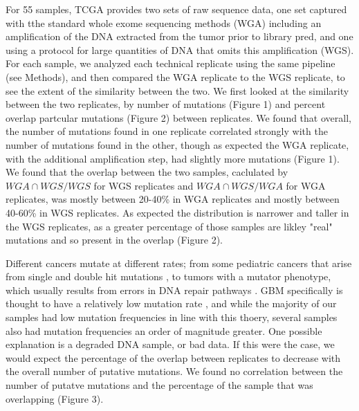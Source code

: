\documentclass[11pt]{article} %
\begin{document}
For 55 samples, TCGA provides two sets of raw sequence data, one set captured with tthe standard whole exome sequencing methods (WGA) including an amplification of the DNA extracted from the tumor prior to library pred, and one using a protocol for large quantities of DNA that omits this amplification (WGS). For each sample, we analyzed each technical replicate using the same pipeline (see Methods), and then compared the WGA replicate to the WGS replicate, to see the extent of the similarity between the two. We first looked at the similarity between the two replicates, by number of mutations (Figure 1) and percent overlap partcular mutations (Figure 2) between replicates. We found that overall, the number of mutations found in one replicate correlated strongly with the number of mutations found in the other, though as expected the WGA replicate, with the additional amplification step, had slightly more mutations (Figure 1). We found that the overlap between the two samples, caclulated by $WGA \cap WGS/WGS$ for WGS replicates and $WGA \cap WGS/WGA$ for WGA replicates, was mostly between 20-40\% in WGA replicates and mostly between 40-60\% in WGS replicates. As expected the distribution is narrower and taller in the WGS replicates, as a greater percentage of those samples are likley "real" mutations and so present in the overlap (Figure 2).

Different cancers mutate at different rates; from some pediatric cancers that arise from single and double hit mutations \cite{pediatric}, to tumors with a mutator phenotype, which usually results from errors in DNA repair pathways \cite{mutator}. GBM specifically is thought to have a relatively low mutation rate \cite{GBM_mut_rate}, and while the majority of our samples had low mutation frequencies in line with this thoery, several samples also had mutation frequencies an order of magnitude greater. One possible explanation is a degraded DNA sample, or bad data. If this were the case, we would expect the percentage of the overlap between replicates to decrease with the overall number of putative mutations. We found no correlation between the number of putatve mutations and the percentage of the sample that was overlapping (Figure 3). 
\end{document}

